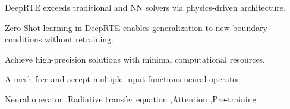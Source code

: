 \documentclass[preprint,3p,times]{elsarticle}
\begin{document}
\begin{frontmatter}
	


	\begin{highlights}
		\item DeepRTE exceeds traditional and NN solvers via physics-driven architecture.
		\item Zero-Shot learning in DeepRTE enables generalization to new boundary conditions without retraining.
		\item Achieve high-precision solutions with minimal computational resources.
		\item A mesh-free and accept multiple input functions neural operator.
	\end{highlights}

	\begin{keyword}
		Neural operator \sep Radiative transfer
		equation \sep Attention \sep Pre-training



	\end{keyword}

\end{frontmatter}











\appendix

\end{document}
